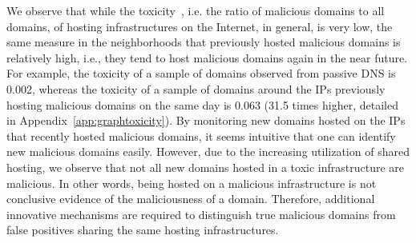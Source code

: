 We observe that while the toxicity~, i.e. the ratio of malicious domains to all domains, of hosting infrastructures on the Internet, in general, is very low, the same measure in the neighborhoods that previously hosted malicious domains is relatively high, i.e., they tend to host malicious domains again in the near future. For example, the toxicity of a sample of domains observed from passive DNS is 0.002, whereas the toxicity of a sample of domains around the IPs previously hosting malicious domains on the same day is 0.063 (31.5 times higher, detailed in Appendix~\ref{app:graphtoxicity}). 
By monitoring new domains hosted on the IPs that recently hosted malicious domains, it seems intuitive that one can identify new malicious domains easily. However, due to the increasing utilization of shared hosting, we observe that not all new domains hosted in a toxic infrastructure are malicious. In other words, being hosted on a malicious infrastructure is not conclusive evidence of the maliciousness of a domain. Therefore, additional innovative mechanisms are required to distinguish true malicious domains from false positives sharing the same hosting infrastructures.



